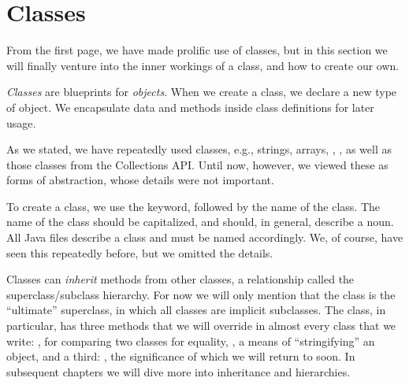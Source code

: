 \section{Classes}
From the first page, we have made prolific use of classes, but in this section we will finally venture into the inner workings of a class, and how to create our own.

\emph{Classes} are blueprints for \emph{objects}. When we create a class, we declare a new type of object. We encapsulate data and methods inside class definitions for later usage.

As we stated, we have repeatedly used classes, e.g., strings, arrays, , , as well as those classes from the Collections API. Until now, however, we viewed these as forms of abstraction, whose details were not important. 

To create a class, we use the  keyword, followed by the name of the class. The name of the class should be capitalized, and should, in general, describe a noun. All Java files describe a class and must be named accordingly. We, of course, have seen this repeatedly before, but we omitted the details.

Classes can \emph{inherit} methods from other classes, a relationship called the superclass/subclass hierarchy. For now we will only mention that the  class is the ``ultimate'' superclass, in which all classes are implicit subclasses. The  class, in particular, has three methods that we will override in almost every class that we write: , for comparing two classes for equality, , a means of ``stringifying'' an object, and a third: , the significance of which we will return to soon. In subsequent chapters we will dive more into inheritance and hierarchies.


